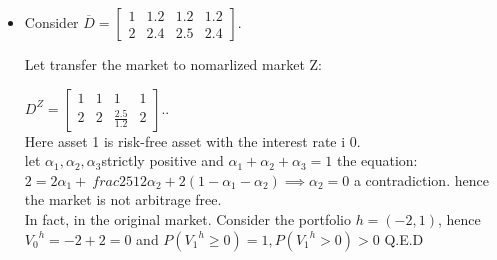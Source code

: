 \documentclass[12pt]{article}
\newcommand{\ol}{\overline}
\begin{document}
\begin{itemize}
\item Consider $\ol{D}=
    \left[\begin{array}{llll}
    1 & 1.2 & 1.2 & 1.2 \\
    2 & 2.4 & 2.5 & 2.4
    \end{array}
    \right]$.
   
  Let transfer the market to nomarlized market Z:
  
  $D^{Z} =
 \left[\begin{array}{llll}
    1 & 1& 1 & 1 \\
    2 & 2& \frac{2.5}{1.2} & 2
    \end{array}
    \right]$..\\
    
Here asset 1 is risk-free asset with the interest rate i $0$.\\
let $\alpha_{1}, \alpha_{2}, \alpha_{3} $strictly positive and $\alpha_{1} +\alpha_{2}+ \alpha_{3}=1$
the equation:\\
$2 = 2\alpha_{1} +\ frac{25}{12}\alpha_{2} + 2(1- \alpha_{1} -\alpha_{2}) \implies \alpha_{2} = 0$  a contradiction. hence the market is not arbitrage free.\\

In fact, in the original market. Consider the portfolio $h= (-2,1)$, hence ${V_{0}}^{h}= -2+2 = 0$ and $P({V_{1}}^{h} \geq 0) = 1, P({V_{1}}^{h} >0) >0$ Q.E.D
 


\end{itemize}
\end{document}
